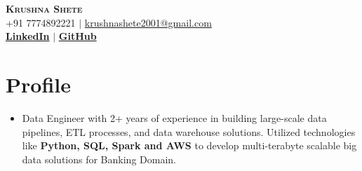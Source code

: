 \documentclass[letterpaper,11pt]{article}
\begin{document}




\begin{center}
    \textbf{\Huge \scshape Krushna Shete} \\ \vspace{1pt}
    \small +91 7774892221 $|$ \href{mailto:krushnashete2001@gmail.com}{{krushnashete2001@gmail.com}}    \\ 
    \small  
    \href{https://www.linkedin.com/in/krushnashete}{\bf LinkedIn} $|$
    \href{https://github.com/krushnashete}{\bf GitHub} 
    
\end{center}



\section{Profile}
\begin{itemize}[leftmargin=0.15in, label={}]
\item 
Data Engineer with 2+ years of experience in building large-scale data pipelines, ETL processes, and data warehouse solutions. Utilized technologies like \textbf{Python, SQL, Spark and AWS} to develop multi-terabyte scalable big data solutions for Banking Domain.
\end{itemize}
\end{document}

